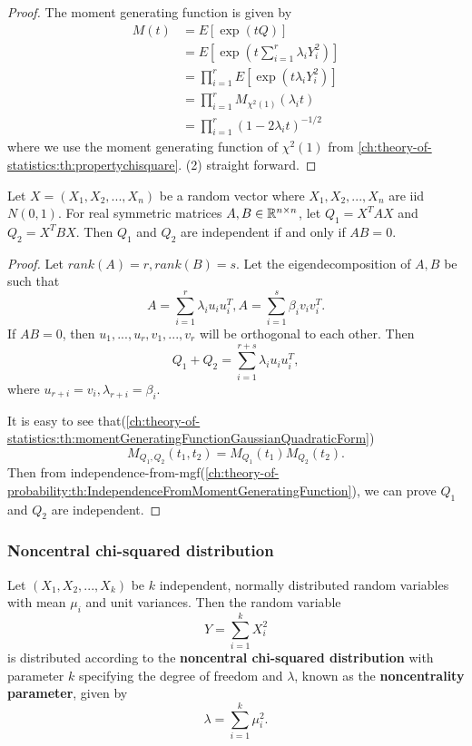 \begin{refsection}
\begin{proof}
The moment generating function is given by
\begin{align*}
M(t) &= E[\exp(tQ )] \\
&= E[\exp(t \sum_{i=1}^r \lambda_i Y_i^2 )] \\
&= \prod_{i=1}^r E[\exp(t \lambda_i Y_i^2 )] \\
&= \prod_{i=1}^r M_{\chi^2(1)}(\lambda_it) \\
& = \prod_{i=1}^r (1 - 2\lambda_i t)^{-1/2}
\end{align*}
where we use the moment generating function of $\chi^2(1)$ from \autoref{ch:theory-of-statistics:th:propertychisquare}.
(2) straight forward. 
\end{proof}



\begin{lemma}\label{ch:theory-of-statistics:th:independenceOfChiSquareQuadraticForms}\cite[528]{hoggintroduction}
Let $X=(X_1,X_2,...,X_n)$ be a random vector where $X_1,X_2,...,X_n$ are iid $N(0,1)$. For real symmetric matrices $A,B\in \mathbb{R}^{n\times n}$, let $Q_1 = X^TAX$ and $Q_2 = X^TBX$. Then $Q_1$ and $Q_2$ are independent if and only if $AB = 0$.	
\end{lemma}
\begin{proof}
Let $rank(A) = r, rank(B) = s$. Let the eigendecomposition of $A,B$ be such that
$$A = \sum_{i=1}^r \lambda_i u_iu_i^T,A = \sum_{i=1}^s 
\beta_i v_iv_i^T.$$
If $AB = 0$, then $u_1,...,u_r, v_1,...,v_r$ will be orthogonal to each other. Then
$$Q_1+Q_2 = \sum_{i=1}^{r+s} \lambda_i u_iu_i^T,$$
where $u_{r+i} = v_i, \lambda_{r+i} = \beta_i$.

It is easy to see that(\autoref{ch:theory-of-statistics:th:momentGeneratingFunctionGaussianQuadraticForm}) 
$$M_{Q_1,Q_2}(t_1,t_2) = M_{Q_1}(t_1)M_{Q_2}(t_2).$$
Then from independence-from-mgf(\autoref{ch:theory-of-probability:th:IndependenceFromMomentGeneratingFunction}), we can prove $Q_1$ and $Q_2$ are independent.
	
\end{proof}

\subsubsection{Noncentral chi-squared distribution}
\begin{definition} Let $(X_1,X_2,...,X_k)$ be $k$ independent, normally distributed random variables with mean $\mu_i$ and unit variances. Then the random variable 
	$$Y = \sum_{i=1}^{k}X_i^2$$
is distributed according to the \textbf{noncentral chi-squared distribution} with parameter $k$ specifying the degree of freedom and $\lambda$, known as the \textbf{noncentrality parameter}, given by
$$\lambda = \sum_{i=1}^k \mu_i^2.$$	
\end{definition}


\end{refsection}

